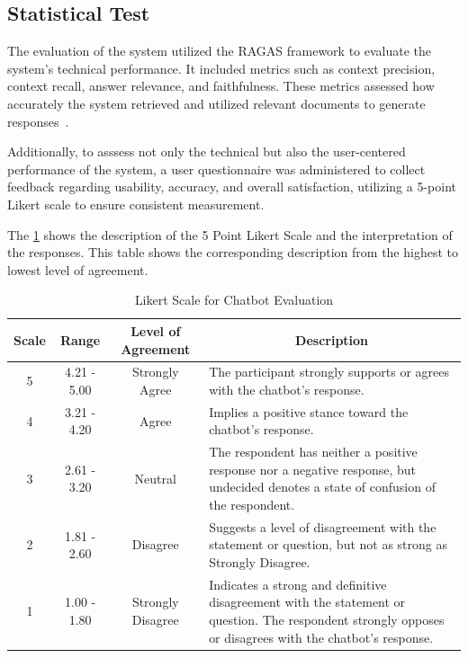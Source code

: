 \begin{refsection}
\section{Statistical Test}

The evaluation of the system utilized the RAGAS framework to evaluate the system's technical performance. It included metrics such as context precision, context recall, answer relevance, and faithfulness. These metrics assessed how accurately the system retrieved and utilized relevant documents to generate responses~\cite{holmes2023chatbot, ameli2024ranking, lin2024satisfaction}.

Additionally, to asssess not only the technical but also the user-centered performance of the system, a user questionnaire was administered to collect feedback regarding usability, accuracy, and overall satisfaction, utilizing a 5-point Likert scale to ensure consistent measurement.

The \ref{tab:likert_scale} shows the description of the 5 Point Likert Scale and the interpretation of the responses. This table shows the corresponding description from the highest to lowest level of agreement.

\begin{table}[H]
    \centering
    \caption{Likert Scale for Chatbot Evaluation}
    \label{tab:likert_scale}
    \begin{tabular}{cccm{7cm}}
        \hline
        \textbf{Scale} & \textbf{Range} & \textbf{Level of Agreement} & \multicolumn{1}{c}{\textbf{Description}} \\
        \hline
                5 & 4.21 - 5.00 & Strongly Agree & The participant strongly supports or agrees with the chatbot's response.\\
        \hline
                4 & 3.21 - 4.20 & Agree & Implies a positive stance toward the chatbot's response. \\
        \hline
                3 & 2.61 - 3.20 & Neutral & The respondent has neither a positive response nor a negative response, but undecided denotes a state of confusion of the respondent. \\
        \hline
                2 & 1.81 - 2.60 & Disagree & Suggests a level of disagreement with the statement or question, but not as strong as Strongly Disagree.\\
        \hline
                1 & 1.00 - 1.80 & Strongly Disagree & Indicates a strong and definitive disagreement with the statement or question. The respondent strongly opposes or disagrees with the chatbot's response.\\
        \hline
    \end{tabular}
\end{table}


\end{refsection}
